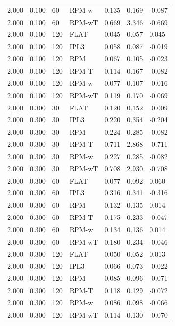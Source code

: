 \begin{tabular}{lllllll}
2.000 & 0.100 & 60 & RPM-w & 0.135 & 0.169 & -0.087 \\
2.000 & 0.100 & 60 & RPM-wT & 0.669 & 3.346 & -0.669 \\
2.000 & 0.100 & 120 & FLAT & 0.045 & 0.057 & 0.045 \\
2.000 & 0.100 & 120 & IPL3 & 0.058 & 0.087 & -0.019 \\
2.000 & 0.100 & 120 & RPM & 0.067 & 0.105 & -0.023 \\
2.000 & 0.100 & 120 & RPM-T & 0.114 & 0.167 & -0.082 \\
2.000 & 0.100 & 120 & RPM-w & 0.077 & 0.107 & -0.016 \\
2.000 & 0.100 & 120 & RPM-wT & 0.119 & 0.170 & -0.069 \\
2.000 & 0.300 & 30 & FLAT & 0.120 & 0.152 & -0.009 \\
2.000 & 0.300 & 30 & IPL3 & 0.220 & 0.354 & -0.204 \\
2.000 & 0.300 & 30 & RPM & 0.224 & 0.285 & -0.082 \\
2.000 & 0.300 & 30 & RPM-T & 0.711 & 2.868 & -0.711 \\
2.000 & 0.300 & 30 & RPM-w & 0.227 & 0.285 & -0.082 \\
2.000 & 0.300 & 30 & RPM-wT & 0.708 & 2.930 & -0.708 \\
2.000 & 0.300 & 60 & FLAT & 0.077 & 0.092 & 0.060 \\
2.000 & 0.300 & 60 & IPL3 & 0.316 & 0.341 & -0.316 \\
2.000 & 0.300 & 60 & RPM & 0.132 & 0.135 & 0.014 \\
2.000 & 0.300 & 60 & RPM-T & 0.175 & 0.233 & -0.047 \\
2.000 & 0.300 & 60 & RPM-w & 0.134 & 0.136 & 0.014 \\
2.000 & 0.300 & 60 & RPM-wT & 0.180 & 0.234 & -0.046 \\
2.000 & 0.300 & 120 & FLAT & 0.050 & 0.052 & 0.013 \\
2.000 & 0.300 & 120 & IPL3 & 0.066 & 0.073 & -0.022 \\
2.000 & 0.300 & 120 & RPM & 0.085 & 0.096 & -0.071 \\
2.000 & 0.300 & 120 & RPM-T & 0.118 & 0.129 & -0.072 \\
2.000 & 0.300 & 120 & RPM-w & 0.086 & 0.098 & -0.066 \\
2.000 & 0.300 & 120 & RPM-wT & 0.114 & 0.130 & -0.070 \\
\hline
\end{tabular}
